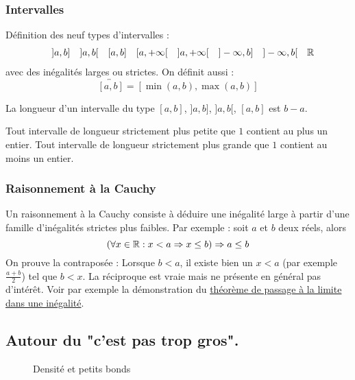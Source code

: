 \subsubsection{Intervalles}
Définition des neuf types d'intervalles : 
\begin{align*}
 [a,b] & & ]a,b] & & ]a,b[ & & [a,b] & & [a,+\infty[ & & ]a,+\infty[ & & ]-\infty, b] & & ]-\infty, b[ & & \R
\end{align*}
avec des inégalités larges ou strictes. On définit aussi :
\begin{displaymath}
 \overleftrightarrow{[a,b]} = [\min(a,b), \max(a,b)]
\end{displaymath}
\begin{defi}
 La longueur d'un intervalle du type $[a,b]$, $]a,b]$, $]a,b[$, $[a,b]$ est $b-a$.
\end{defi}
\begin{rem}
 Tout intervalle de longueur strictement plus petite que $1$ contient au plus un entier. Tout intervalle de longueur strictement plus grande que $1$ contient au moins un entier.
\end{rem}


\subsubsection{Raisonnement à la Cauchy}
Un raisonnement à la Cauchy consiste à déduire une inégalité large à partir d'une famille d'inégalités strictes plus faibles.\newline
Par exemple : soit $a$ et $b$ deux réels, alors
\begin{displaymath}
 \left( \forall x \in \mathbb{R}: x < a \Rightarrow x\leq b\right)  \Rightarrow a\leq b
\end{displaymath}
On prouve la contraposée : \newline
Lorsque $b<a$, il existe bien un $x<a$ (par exemple $\frac{a+b}{2}$) tel que $b<x$. La réciproque est vraie mais ne présente en général pas d'intérêt.\newline
Voir par exemple la démonstration du \href{\baseurl C2069.pdf}{théorème de passage à la limite dans une inégalité}.


\subsection{Autour du "c'est pas trop gros".}
\begin{figure}[ht]
 \centering
 
 \caption{Densité et petits bonds}
 \label{fig:C2192_1}
\end{figure}

